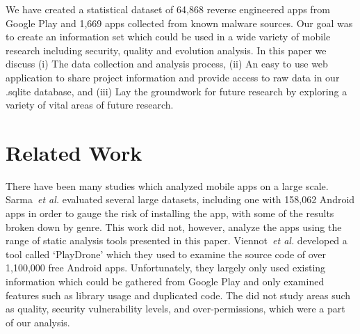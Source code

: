 \documentclass{sig-alternate-05-2015}
\begin{document}



We have created a statistical dataset of 64,868 reverse engineered apps from Google Play and 1,669 apps collected from known malware sources. Our goal was to create an information set which could be used in a wide variety of mobile research including security, quality and evolution analysis. In this paper we discuss (i) The data collection and analysis process, (ii) An easy to use web application to share project information and provide access to raw data in our .sqlite database, and (iii) Lay the groundwork for future research by exploring a variety of vital areas of future research.



\section{Related Work}
\label{sec: relatedworks}

There have been many studies which analyzed mobile apps on a large scale. Sarma~\emph{et al.}\cite{Sarma:2012:APP:2295136.2295141} evaluated several large datasets, including one with 158,062 Android apps in order to gauge the risk of installing the app, with some of the results broken down by genre. This work did not, however, analyze the apps using the range of static analysis tools presented in this paper. Viennot~\emph{et al.}\cite{Viennot:2014:MSG:2637364.2592003} developed a tool called `PlayDrone' which they used to examine the source code of over 1,100,000 free Android apps. Unfortunately, they largely only used existing information which could be gathered from Google Play and only examined features such as library usage and duplicated code. The did not study areas such as quality, security vulnerability levels, and over-permissions, which were a part of our analysis.
\end{document}
